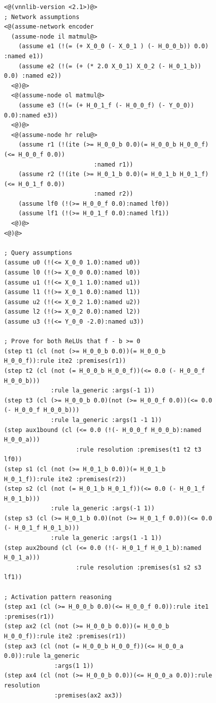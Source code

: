 \begin{figure}[p]
\begin{lstlisting}[style=lbnf,basicstyle=\ttfamily\scriptsize\bfseries,linewidth=1.05\textwidth]
<@(vnnlib-version <2.1>)@>
; Network assumptions
<@(assume-network encoder
  (assume-node il matmul@>
    (assume e1 (!(= (+ X_0_0 (- X_0_1 ) (- H_0_0_b)) 0.0) :named e1))
    (assume e2 (!(= (+ (* 2.0 X_0_1) X_0_2 (- H_0_1_b)) 0.0) :named e2))
  <@)@>
  <@(assume-node ol matmul@>
    (assume e3 (!(= (+ H_0_1_f (- H_0_0_f) (- Y_0_0)) 0.0):named e3))
  <@)@>
  <@(assume-node hr relu@>
    (assume r1 (!(ite (>= H_0_0_b 0.0)(= H_0_0_b H_0_0_f)(<= H_0_0_f 0.0))
	                     :named r1))
    (assume r2 (!(ite (>= H_0_1_b 0.0)(= H_0_1_b H_0_1_f)(<= H_0_1_f 0.0))
	                     :named r2))
    (assume lf0 (!(>= H_0_0_f 0.0):named lf0))
    (assume lf1 (!(>= H_0_1_f 0.0):named lf1))
  <@)@>
<@)@>

; Query assumptions
(assume u0 (!(<= X_0_0 1.0):named u0))
(assume l0 (!(>= X_0_0 0.0):named l0))
(assume u1 (!(<= X_0_1 1.0):named u1))
(assume l1 (!(>= X_0_1 0.0):named l1))
(assume u2 (!(<= X_0_2 1.0):named u2))
(assume l2 (!(>= X_0_2 0.0):named l2))
(assume u3 (!(<= Y_0_0 -2.0):named u3))
	
; Prove for both ReLUs that f - b >= 0
(step t1 (cl (not (>= H_0_0_b 0.0))(= H_0_0_b H_0_0_f)):rule ite2 :premises(r1))
(step t2 (cl (not (= H_0_0_b H_0_0_f))(<= 0.0 (- H_0_0_f H_0_0_b)))
             :rule la_generic :args(-1 1))
(step t3 (cl (>= H_0_0_b 0.0)(not (>= H_0_0_f 0.0))(<= 0.0 (- H_0_0_f H_0_0_b)))
             :rule la_generic :args(1 -1 1))
(step aux1bound (cl (<= 0.0 (!(- H_0_0_f H_0_0_b):named H_0_0_a)))
                    :rule resolution :premises(t1 t2 t3 lf0))
(step s1 (cl (not (>= H_0_1_b 0.0))(= H_0_1_b H_0_1_f)):rule ite2 :premises(r2))
(step s2 (cl (not (= H_0_1_b H_0_1_f))(<= 0.0 (- H_0_1_f H_0_1_b)))
             :rule la_generic :args(-1 1))
(step s3 (cl (>= H_0_1_b 0.0)(not (>= H_0_1_f 0.0))(<= 0.0 (- H_0_1_f H_0_1_b))) 
             :rule la_generic :args(1 -1 1))
(step aux2bound (cl (<= 0.0 (!(- H_0_1_f H_0_1_b):named H_0_1_a)))
                    :rule resolution :premises(s1 s2 s3 lf1))
	                
; Activation pattern reasoning
(step ax1 (cl (>= H_0_0_b 0.0)(<= H_0_0_f 0.0)):rule ite1 :premises(r1))
(step ax2 (cl (not (>= H_0_0_b 0.0))(= H_0_0_b H_0_0_f)):rule ite2 :premises(r1))
(step ax3 (cl (not (= H_0_0_b H_0_0_f))(<= H_0_0_a 0.0)):rule la_generic
              :args(1 1))
(step ax4 (cl (not (>= H_0_0_b 0.0))(<= H_0_0_a 0.0)):rule resolution 
              :premises(ax2 ax3))
	

\end{lstlisting}
\end{figure}
